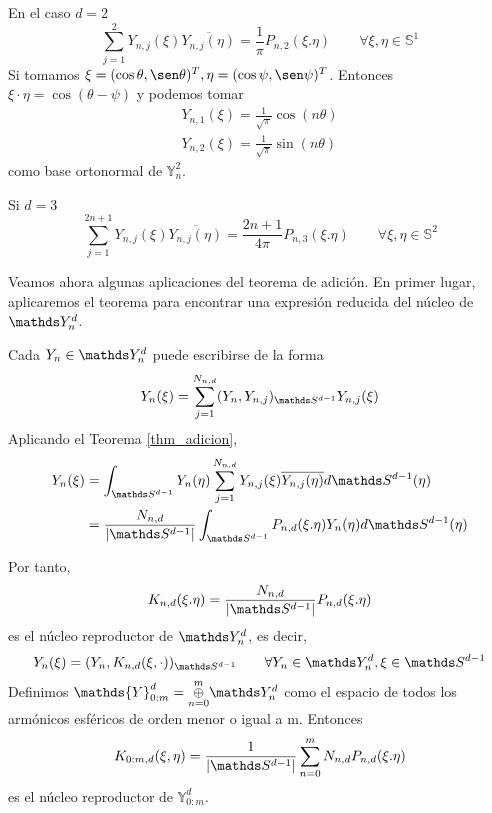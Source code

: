 \medskip 

\begin{example}En el caso $d=2$ $$
	\sum_{j=1}^{2}Y_{n,j}(\xi)\overline{Y_{n,j}(\eta)} = \frac{1}{\pi}P_{n,2}(\xi.\eta)	\qquad	\forall \xi,\eta \in \mathds{S}^{1}
	$$
Si tomamos $\xi= (\cos \theta,\sen \theta)^T, \eta=(\cos \psi,\sen \psi)^T$. Entonces $\xi\cdot\eta = \cos(\theta - \psi)$ y podemos tomar
\begin{gather}\label{base_d2}
Y_{n,1}(\xi) = \frac{1}{\sqrt{\pi}} \cos(n\theta) \\
Y_{n,2}(\xi) = \frac{1}{\sqrt{\pi}} \sin(n\theta) 
\end{gather}
como base ortonormal de $\mathds{Y}^2_n$.
\end{example}
\begin{example}Si $d=3$ $$
	\sum_{j=1}^{2n+1}Y_{n,j}(\xi)\overline{Y_{n,j}(\eta)} = \frac{2n+1}{4\pi}P_{n,3}(\xi.\eta)\qquad		\forall \xi,\eta \in \mathds{S}^{2}
$$	
\end{example}
Veamos ahora algunas aplicaciones del teorema de adición. En primer lugar, aplicaremos el teorema para encontrar una expresión reducida del núcleo de $\spharm$.
\medskip

Cada $Y_n \in \spharm$ puede escribirse de la forma
$$Y_n(\xi) = \sum_{j=1}^{N_{n,d}} (Y_n,Y_{n,j})_{\sphere} Y_{n,j}(\xi)$$
Aplicando el Teorema \ref{thm_adicion},
\begin{gather*}
\begin{aligned}
Y_n(\xi)&=\int_{\sphere} Y_n(\eta)\sum_{j=1}^{N_{n,d}}Y_{n,j}(\xi)\overline{Y_{n,j}(\eta)}d\sphere(\eta) \\&=   \frac{N_{n,d}}{|\sphere|}\int_{\sphere}P_{n,d}(\xi.\eta)Y_n(\eta)d\sphere(\eta)
\end{aligned}
\end{gather*}

Por tanto, $$
K_{n,d}(\xi.\eta)= \frac{N_{n,d}}{|\sphere|}P_{n,d}(\xi.\eta)
$$
es el núcleo reproductor de $\spharm$, es decir, $$
Y_n(\xi) = (Y_n,K_{n,d}(\xi,\cdot))_{\sphere} \qquad \forall Y_n \in \spharm, \xi \in \sphere$$
Definimos $\mathds{Y}_{0:m}^d = \underset{n=0}{\overset{m}{\oplus}} \spharm$ como el espacio de todos los armónicos esféricos de orden menor o igual a m. Entonces 
$${K}_{0:m,d}(\xi,\eta) = \frac{1}{|\sphere|}\sum_{n=0}^{m}N_{n,d}P_{n,d}(\xi.\eta)$$ es el núcleo reproductor de  $\mathds{Y}_{0:m}^d$.
\medskip

